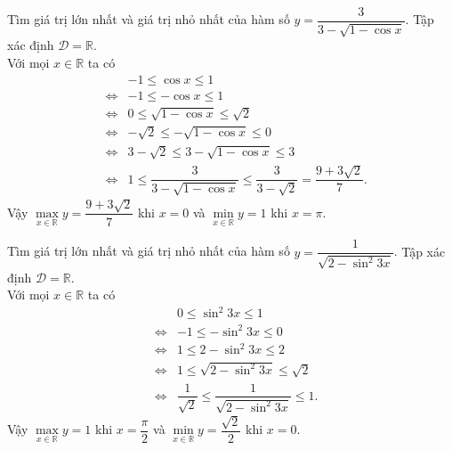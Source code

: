 \begin{bt}%
	Tìm giá trị lớn nhất và giá trị nhỏ nhất của hàm số $y=\dfrac{3}{3-\sqrt{1-\cos x}}$.
	\loigiai
	{Tập xác định $\mathscr{D}=\mathbb{R}$.\\
		Với mọi $x\in \mathbb{R}$ ta có
		\allowdisplaybreaks
		\begin{eqnarray*}
			& &-1\leq \cos x\leq 1\\
			&\Leftrightarrow&-1\leq -\cos x\leq 1\\
			&\Leftrightarrow&0\leq \sqrt{1-\cos x}\leq \sqrt{2}\\
			&\Leftrightarrow&-\sqrt{2}\leq -\sqrt{1-\cos x}\leq 0\\
			&\Leftrightarrow&3-\sqrt{2}\leq 3 -\sqrt{1-\cos x}\leq 3\\
			&\Leftrightarrow&1\leq \dfrac{3}{3-\sqrt{1-\cos x}}\leq \dfrac{3}{3-\sqrt{2}}=\dfrac{9+3\sqrt{2}}{7}.
		\end{eqnarray*}
		Vậy $\max\limits_{x \in \mathbb{R}} y=\dfrac{9+3\sqrt{2}}{7}$ khi $x=0$ và $\min\limits_{x \in \mathbb{R}} y=1$ khi $x=\pi$.
	}
\end{bt}

\begin{bt}%
	Tìm giá trị lớn nhất và giá trị nhỏ nhất của hàm số $y=\dfrac{1}{\sqrt{2-\sin ^{2} 3 x}}$.
	\loigiai
	{Tập xác định $\mathscr{D}=\mathbb{R}$.\\
		Với mọi $x\in \mathbb{R}$ ta có
		\allowdisplaybreaks
		\begin{eqnarray*}
			& & 0\leq \sin^2 3x\leq 1\\
			&\Leftrightarrow& -1\leq -\sin^2 3x\leq 0\\
			&\Leftrightarrow&1\leq 2-\sin^2 3x\leq 2\\
			&\Leftrightarrow&1\leq \sqrt{2-\sin^2 3x}\leq \sqrt{2}\\
			&\Leftrightarrow&\dfrac{1}{\sqrt{2}}\leq \dfrac{1}{\sqrt{2-\sin^2 3x}}\leq 1.
		\end{eqnarray*}
		Vậy $\max\limits_{x \in \mathbb{R}} y=1$ khi $x=\dfrac{\pi}{2}$ và $\min\limits_{x \in \mathbb{R}} y=\dfrac{\sqrt{2}}{2}$ khi $x=0$.
	}
\end{bt}

